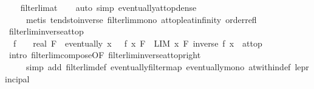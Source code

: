 \begin{isabellebody}
%
\isadelimproof
\ \ %
\endisadelimproof
%
\isatagproof
{}\isamarkupfalse%
\ filterlim{\isacharunderscore}{\kern0pt}at\isanewline
\ \ \isamarkupfalse%
\ {\isacharparenleft}{\kern0pt}auto\ simp{\isacharcolon}{\kern0pt}\ eventually{\isacharunderscore}{\kern0pt}at{\isacharunderscore}{\kern0pt}top{\isacharunderscore}{\kern0pt}dense{\isacharparenright}{\kern0pt}\isanewline
\ \ \ \ \ {\isacharparenleft}{\kern0pt}metis\ tendsto{\isacharunderscore}{\kern0pt}inverse{\isacharunderscore}{\kern0pt}{}\ filterlim{\isacharunderscore}{\kern0pt}mono\ at{\isacharunderscore}{\kern0pt}top{\isacharunderscore}{\kern0pt}le{\isacharunderscore}{\kern0pt}at{\isacharunderscore}{\kern0pt}infinity\ order{\isacharunderscore}{\kern0pt}refl{\isacharparenright}{\kern0pt}%
\endisatagproof
{\isafoldproof}%
%
\isadelimproof
\isanewline
%
\endisadelimproof
\isanewline
{}\isamarkupfalse%
\ filterlim{\isacharunderscore}{\kern0pt}inverse{\isacharunderscore}{\kern0pt}at{\isacharunderscore}{\kern0pt}top{\isacharcolon}{\kern0pt}\isanewline
\ \ {\isachardoublequoteopen}{\isacharparenleft}{\kern0pt}f\ {\isasymlonglongrightarrow}\ {\isacharparenleft}{\kern0pt}{}\ {\isacharcolon}{\kern0pt}{\isacharcolon}{\kern0pt}\ real{\isacharparenright}{\kern0pt}{\isacharparenright}{\kern0pt}\ F\ {\isasymLongrightarrow}\ eventually\ {\isacharparenleft}{\kern0pt}{\isasymlambda}x{\isachardot}{\kern0pt}\ {}\ {\isacharless}{\kern0pt}\ f\ x{\isacharparenright}{\kern0pt}\ F\ {\isasymLongrightarrow}\ LIM\ x\ F{\isachardot}{\kern0pt}\ inverse\ {\isacharparenleft}{\kern0pt}f\ x{\isacharparenright}{\kern0pt}\ {\isacharcolon}{\kern0pt}{\isachargreater}{\kern0pt}\ at{\isacharunderscore}{\kern0pt}top{\isachardoublequoteclose}\isanewline
%
\isadelimproof
\ \ %
\endisadelimproof
%
\isatagproof
{}\isamarkupfalse%
\ {\isacharparenleft}{\kern0pt}intro\ filterlim{\isacharunderscore}{\kern0pt}compose{\isacharbrackleft}{\kern0pt}OF\ filterlim{\isacharunderscore}{\kern0pt}inverse{\isacharunderscore}{\kern0pt}at{\isacharunderscore}{\kern0pt}top{\isacharunderscore}{\kern0pt}right{\isacharbrackright}{\kern0pt}{\isacharparenright}{\kern0pt}\isanewline
\ \ \ \ \ {\isacharparenleft}{\kern0pt}simp\ add{\isacharcolon}{\kern0pt}\ filterlim{\isacharunderscore}{\kern0pt}def\ eventually{\isacharunderscore}{\kern0pt}filtermap\ eventually{\isacharunderscore}{\kern0pt}mono\ at{\isacharunderscore}{\kern0pt}within{\isacharunderscore}{\kern0pt}def\ le{\isacharunderscore}{\kern0pt}principal{\isacharparenright}{\kern0pt}%
\endisatagproof
{\isafoldproof}%
%

\end{isabellebody}
